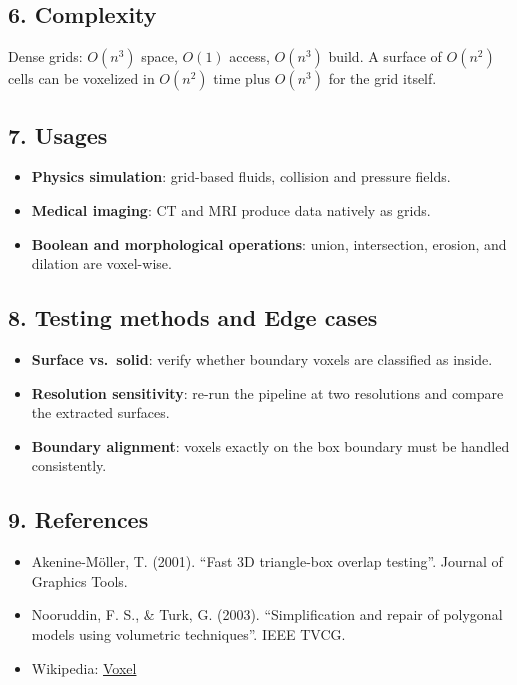 \subsection{6. Complexity}
Dense grids: $O(n^3)$ space, $O(1)$ access, $O(n^3)$ build. A surface of $O(n^2)$
cells can be voxelized in $O(n^2)$ time plus $O(n^3)$ for the grid itself.

\subsection{7. Usages}
\begin{itemize}
    \item \textbf{Physics simulation}: grid-based fluids, collision and pressure fields.
    \item \textbf{Medical imaging}: CT and MRI produce data natively as grids.
    \item \textbf{Boolean and morphological operations}: union, intersection, erosion, and dilation are voxel-wise.
\end{itemize}

\subsection{8. Testing methods and Edge cases}
\begin{itemize}
    \item \textbf{Surface vs.\ solid}: verify whether boundary voxels are classified as inside.
    \item \textbf{Resolution sensitivity}: re-run the pipeline at two resolutions and compare the extracted surfaces.
    \item \textbf{Boundary alignment}: voxels exactly on the box boundary must be handled consistently.
\end{itemize}

\subsection{9. References}
\begin{itemize}
    \item Akenine-M\"oller, T. (2001). ``Fast 3D triangle-box overlap testing''. Journal of Graphics Tools.
    \item Nooruddin, F. S., \& Turk, G. (2003). ``Simplification and repair of polygonal models using volumetric techniques''. IEEE TVCG.
    \item Wikipedia: \href{https://en.wikipedia.org/wiki/Voxel}{Voxel}
\end{itemize}

